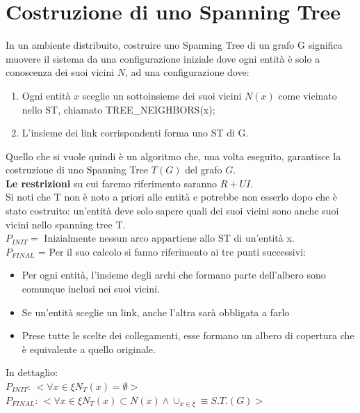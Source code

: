 \chapter{Costruzione di uno Spanning Tree}
In un ambiente distribuito, costruire uno Spanning Tree di un grafo G significa muovere il sistema da una configurazione iniziale dove ogni entità è solo a conoscenza dei suoi vicini $N$, ad una configurazione dove:

\begin{enumerate}
  \item Ogni entità $x$ sceglie un sottoinsieme dei suoi vicini $N(x)$ come vicinato nello ST, chiamato TREE\_NEIGHBORS(x);
  \item L'insieme dei link corrispondenti forma uno ST di G.
\end{enumerate}
Quello che si vuole quindi è un algoritmo che, una volta eseguito, garantisce la costruzione di uno Spanning Tree $T(G)$ del grafo $G$.\\
\textbf{Le restrizioni} su cui faremo riferimento saranno $R+UI$.\\
Si noti che T non è noto a priori alle entità e potrebbe non esserlo dopo che è stato costruito: un'entità deve solo sapere quali dei suoi vicini sono anche suoi vicini nello spanning tree T.\\
$P_{INIT} = $ Inizialmente nessun arco appartiene allo ST di un'entità x.\\
$P_{FINAL}$ = Per il suo calcolo si fanno riferimento ai tre punti successivi:
\begin{itemize}
    \item Per ogni entità, l'insieme degli archi che formano parte dell'albero sono comunque inclusi nei suoi vicini.
    \item Se un'entità sceglie un link, anche l'altra sarà obbligata a farlo
    \item Prese tutte le scelte dei collegamenti, esse formano un albero di copertura che è equivalente a quello originale.
\end{itemize}
In dettaglio:\\
$P_{INIT}$: $< \forall x \in \xi N_T(x) = \emptyset >$\\
$P_{FINAL}$: $< \forall x \in \xi N_T(x) \subset N(x) \land \cup_{x \in \xi} \equiv S.T.(G)>$

